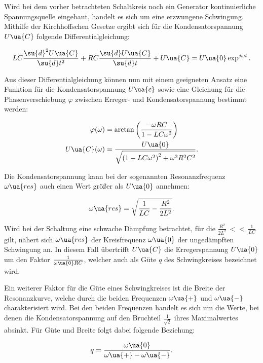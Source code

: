 Wird bei dem vorher betrachteten Schaltkreis noch ein Generator kontinuierliche
Spannungsquelle eingebaut,
handelt es sich um eine erzwungene Schwingung. Mithilfe der
Kirchhoffschen Gesetze ergibt sich für die Kondensatorspannung $U\ua{C}$
folgende Differentialgleichung:

\begin{equation}
  LC\frac{\su{d}^2U\ua{C}}{\su{d}t^2} + RC\frac{\su{d}U\ua{C}}{\su{d}t} + U\ua{C} = U\ua{0} \exp^{j\omega t} .
\end{equation}

Aus dieser Differentialgleichung können nun mit einem geeigneten Ansatz eine Funktion
für die Kondensatorspannung $U\ua{c}$ sowie eine Gleichung für die Phasenverschiebung
$\varphi$ zwischen Erreger- und Kondensatorspannung bestimmt werden:

\begin{align}
  \varphi(\omega) &= \arctan \left( \frac{-\omega RC}{1 - LC\omega^2} \right) \\
  U\ua{C}(\omega) &= \frac{U\ua{0}}{ \sqrt{ \left(1 - LC\omega^2 \right)^2 + \omega^2R^2C^2}} .
\end{align}

Die Kondensatorspannung kann bei der sogenannten Resonanzfrequenz $\omega\ua{res}$
auch einen Wert größer als $U\ua{0}$ annehmen:

\begin{equation}
  \label{eqn:omega_res}
  \omega\ua{res} = \sqrt{\frac{1}{LC} - \frac{R^2}{2L^2}} .
\end{equation}

Wird bei der Schaltung eine schwache Dämpfung betrachtet, für die
$\frac{R^2}{2L^2} \, << \, \frac{1}{LC}$ gilt, nähert sich $\omega\ua{res}$
der Kreisfrequenz $\omega\ua{0}$ der ungedämpften Schwingung an. In diesem
Fall übertrifft $U\ua{C}$ die Erregerspannung $U\ua{0}$ um den Faktor
$\frac{1}{\omega\ua{0}RC}$, welcher auch als Güte $q$ des Schwingkreises bezeichnet wird.

Ein weiterer Faktor für die Güte eines Schwingkreises ist die Breite der Resonanzkurve,
welche durch die beiden Frequenzen $\omega\ua{+}$ und $\omega\ua{-}$ charakterisiert
wird. Bei den beiden Frequenzen handelt es sich um die Werte, bei denen die
Kondensatorspannung auf den Bruchteil $\frac{1}{\sqrt{2}}$ ihres Maximalwertes
absinkt. Für Güte und Breite folgt dabei folgende Beziehung:

\begin{equation}
  q = \frac{\omega\ua{0}}{\omega\ua{+} - \omega\ua{-}} .
\end{equation}

